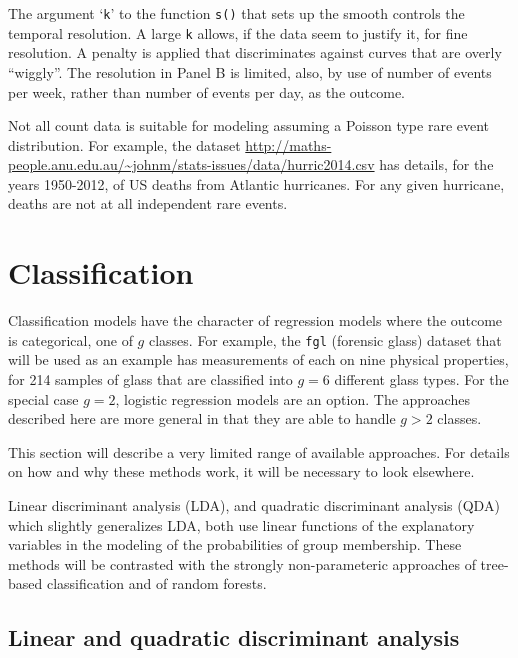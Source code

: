 \documentclass{tufte-book}\usepackage[]{graphicx}\usepackage[]{color}
\newcommand{\txtt}[1]{\texttt{#1}}
\begin{document}
The argument `\txtt{k}' to the function \txtt{s()} that sets up the
smooth controls the temporal resolution.  A large \txtt{k} allows, if the data
seem to justify it, for fine resolution. A penalty is applied that discriminates
against curves that are overly ``wiggly''.  The resolution in Panel B is
limited, also, by use of number of events per week, rather than number
of events per day, as the outcome.
\enlargethispage{12pt}

Not all count data is suitable for modeling assuming a Poisson type
rare event distribution. For example, the dataset
\url{http://maths-people.anu.edu.au/~johnm/stats-issues/data/hurric2014.csv}
has details, for the years 1950-2012, of US deaths from Atlantic
hurricanes.  For any given hurricane, deaths are not at all independent
rare events.

\section{Classification}

Classification models have the character of regression models where
the outcome is categorical, one of $g$ classes.  For example, the
\texttt{fgl} (forensic glass) dataset that will be used as an example
has measurements of each on nine physical properties, for 214 samples
of glass that are classified into $g=6$ different glass types.  For
the special case $g = 2$, logistic regression models are an
option. The approaches described here are more general in that they
are able to handle $g > 2$ classes.

This section will describe a very limited range of available
approaches.  For details
on how and why these methods work, it will be necessary to look
elsewhere.

Linear discriminant analysis (LDA), and quadratic
discriminant analysis (QDA) which slightly generalizes LDA,
both use linear functions of the explanatory variables in the
modeling of the probabilities of group membership.  These
methods will be contrasted with the strongly non-parameteric
approaches of tree-based classification and of random forests.

\subsection*{Linear and quadratic discriminant analysis}
\end{document}
